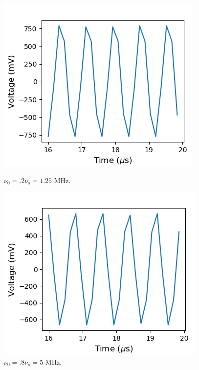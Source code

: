 \documentclass[a4paper]{article}
\begin{document}
\begin{figure}
\centering
\begin{minipage}{.5\textwidth}
	\centering
	\includegraphics[width=.8\linewidth]{5-2/trial2}
	\caption{$\nu_0 = .2 \nu_s = 1.25$ MHz.}
	\label{fig:Nyq2}
\end{minipage}%
\begin{minipage}{.5\textwidth}
	\centering
	\includegraphics[width=.8\linewidth]{5-2/trial8}
	\caption{$\nu_0 = .8 \nu_s = 5$ MHz.}
	\label{fig:Nyq8}
\end{minipage}
\end{figure}
\end{document}
